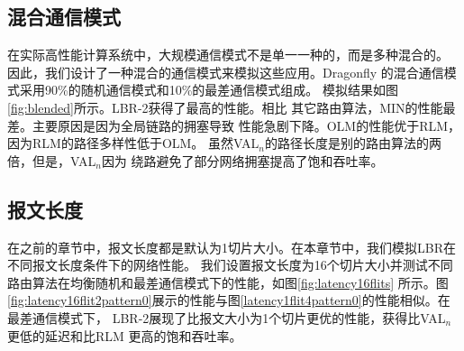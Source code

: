 \subsection{混合通信模式}

在实际高性能计算系统中，大规模通信模式不是单一一种的，而是多种混合的。
因此，我们设计了一种混合的通信模式来模拟这些应用。Dragonfly
的混合通信模式采用90\%的随机通信模式和10\%的最差通信模式组成。
模拟结果如图\ref{fig:blended}所示。LBR-2获得了最高的性能。相比
其它路由算法，MIN的性能最差。主要原因是因为全局链路的拥塞导致
性能急剧下降。OLM的性能优于RLM，因为RLM的路径多样性低于OLM。
虽然VAL$_n$的路径长度是别的路由算法的两倍，但是，VAL$_n$因为
绕路避免了部分网络拥塞提高了饱和吞吐率。


  \begin{figure*}[htbp]
  \centering
  \begin{minipage}[t]{\textwidth}
  \centering
  \caption{混合通信模式}
  \label{fig:blended}
  \end{minipage}
\end{figure*}

\subsection{报文长度}

在之前的章节中，报文长度都是默认为1切片大小。在本章节中，我们模拟LBR在不同报文长度条件下的网络性能。
我们设置报文长度为16个切片大小并测试不同路由算法在均衡随机和最差通信模式下的性能，如图\ref{fig:latency16flits}
所示。图\ref{fig:latency16flit2pattern0}展示的性能与图\ref{latency1flit4pattern0}的性能相似。在最差通信模式下，
LBR-2展现了比报文大小为1个切片更优的性能，获得比VAL$_n$更低的延迟和比RLM 更高的饱和吞吐率。

\begin{figure*}[htbp]

\centering
  \begin{minipage}[t]{\textwidth}
  \centering
  \caption{报文长度为16个切片的延迟}
  \label{fig:latency16flits}
  \end{minipage}
  \end{figure*}


